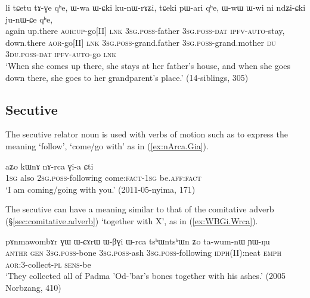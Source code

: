 \begin{exe}
\ex \label{ex:WCki.kunWrAZi}
\gll  li tɕetu tɤ-ɣe qʰe, ɯ-wa ɯ-ɕki ku-nɯ-rɤʑi, tɕeki pɯ-ari qʰe, ɯ-wɯ ɯ-wi ni ndʑi-ɕki ju-nɯ-ɕe qʰe, \\
again up.there \textsc{aor}:\textsc{up}-go[II] \textsc{lnk} \textsc{3sg}.\textsc{poss}-father \textsc{3sg}.\textsc{poss}-\textsc{dat} \textsc{ipfv}-\textsc{auto}-stay, down.there \textsc{aor}-go[II] \textsc{lnk} \textsc{3sg}.\textsc{poss}-grand.father \textsc{3sg}.\textsc{poss}-grand.mother \textsc{du} \textsc{3du}.\textsc{poss}-\textsc{dat} \textsc{ipfv}-\textsc{auto}-go \textsc{lnk}  \\
\glt `When she comes up there, she stays at her father's house, and when she goes down there, she goes to her grandparent's place.' (14-siblings, 305)
\end{exe}

\subsection{Secutive} \label{sec:secutive} 
The secutive relator noun  is used with verbs of motion such as  to express the meaning `follow', `come/go with' as in (\ref{ex:nArca.Gia}).

\begin{exe}
\ex \label{ex:nArca.Gia}
 \gll  aʑo kɯnɤ nɤ-rca ɣi-a ɕti \\
 \textsc{1sg} also \textsc{2sg}.\textsc{poss}-following come:\textsc{fact}-\textsc{1sg} be.\textsc{aff}:\textsc{fact} \\
\glt `I am coming/going with you.' (2011-05-nyima, 171)
\end{exe}

The secutive can have a meaning similar to that of the comitative adverb (§\ref{sec:comitative.adverb}) `together with X', as in (\ref{ex:WBGi.Wrca}).

\begin{exe}
\ex \label{ex:WBGi.Wrca}
 \gll  pɤnmawombɤr ɣɯ ɯ-ɕɤrɯ ɯ-βɣi ɯ-rca tsʰɯntsʰɯn ʑo ta-wum-nɯ ɲɯ-ŋu \\ 
\textsc{anthr} \textsc{gen} \textsc{3sg}.\textsc{poss}-bone \textsc{3sg}.\textsc{poss}-ash \textsc{3sg}.\textsc{poss}-following \textsc{idph}(II):neat \textsc{emph} \textsc{aor}:3\flobv{}-collect-\textsc{pl} \textsc{sens}-be  \\
\glt `They collected all of Padma 'Od-'bar's bones together with his ashes.' (2005 Norbzang, 410)
\end{exe}

